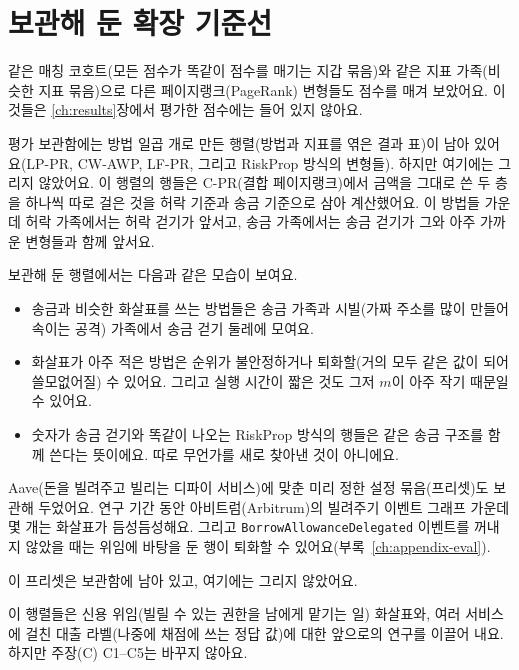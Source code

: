 \section{보관해 둔 확장 기준선}
\label{ch:appendix-archive}

같은 매칭 코호트(모든 점수가 똑같이 점수를 매기는 지갑 묶음)와 같은 지표 가족(비슷한 지표 묶음)으로 다른 페이지랭크(PageRank) 변형들도 점수를 매겨 보았어요. 이것들은 \ref{ch:results}장에서 평가한 점수에는 들어 있지 않아요.


평가 보관함에는 방법 일곱 개로 만든 행렬(방법과 지표를 엮은 결과 표)이 남아 있어요(LP-PR, CW-AWP, LF-PR, 그리고 RiskProp 방식의 변형들). 하지만 여기에는 그리지 않았어요. 이 행렬의 행들은 C-PR(결합 페이지랭크)에서 금액을 그대로 쓴 두 층을 하나씩 따로 걸은 것을 허락 기준과 송금 기준으로 삼아 계산했어요. 이 방법들 가운데 허락 가족에서는 허락 걷기가 앞서고, 송금 가족에서는 송금 걷기가 그와 아주 가까운 변형들과 함께 앞서요.

보관해 둔 행렬에서는 다음과 같은 모습이 보여요.

\begin{itemize}
\item 송금과 비슷한 화살표를 쓰는 방법들은 송금 가족과 시빌(가짜 주소를 많이 만들어 속이는 공격) 가족에서 송금 걷기 둘레에 모여요.
\item 화살표가 아주 적은 방법은 순위가 불안정하거나 퇴화할(거의 모두 같은 값이 되어 쓸모없어질) 수 있어요. 그리고 실행 시간이 짧은 것도 그저 $m$이 아주 작기 때문일 수 있어요.
\item 숫자가 송금 걷기와 똑같이 나오는 RiskProp 방식의 행들은 같은 송금 구조를 함께 쓴다는 뜻이에요. 따로 무언가를 새로 찾아낸 것이 아니에요.
\end{itemize}


Aave(돈을 빌려주고 빌리는 디파이 서비스)에 맞춘 미리 정한 설정 묶음(프리셋)도 보관해 두었어요. 연구 기간 동안 아비트럼(Arbitrum)의 빌려주기 이벤트 그래프 가운데 몇 개는 화살표가 듬성듬성해요. 그리고 \texttt{BorrowAllowanceDelegated} 이벤트를 꺼내지 않았을 때는 위임에 바탕을 둔 행이 퇴화할 수 있어요(부록~\ref{ch:appendix-eval}).

이 프리셋은 보관함에 남아 있고, 여기에는 그리지 않았어요.

이 행렬들은 신용 위임(빌릴 수 있는 권한을 남에게 맡기는 일) 화살표와, 여러 서비스에 걸친 대출 라벨(나중에 채점에 쓰는 정답 값)에 대한 앞으로의 연구를 이끌어 내요. 하지만 주장(C) C1--C5는 바꾸지 않아요.

